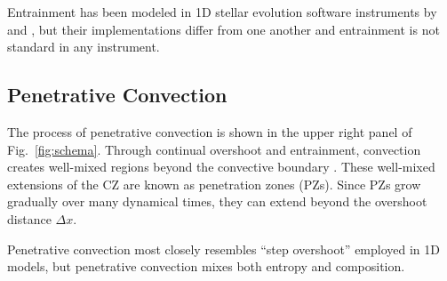 Entrainment has been modeled in 1D stellar evolution software instruments by \citet{staritsin_2013} and \citet{scott_etal_2021}, but their implementations differ from one another and entrainment is not standard in any instrument.


\subsection{Penetrative Convection}
The process of penetrative convection is shown in the upper right panel of Fig.~\ref{fig:schema}.
Through continual overshoot and entrainment, convection creates well-mixed regions beyond the convective boundary \citep{anders_etal_2021}.
These well-mixed extensions of the CZ are known as penetration zones (PZs).
Since PZs grow gradually over many dynamical times, they can extend beyond the overshoot distance $\Delta x$.

Penetrative convection most closely resembles ``step overshoot'' employed in 1D models, but penetrative convection mixes both entropy and composition.
